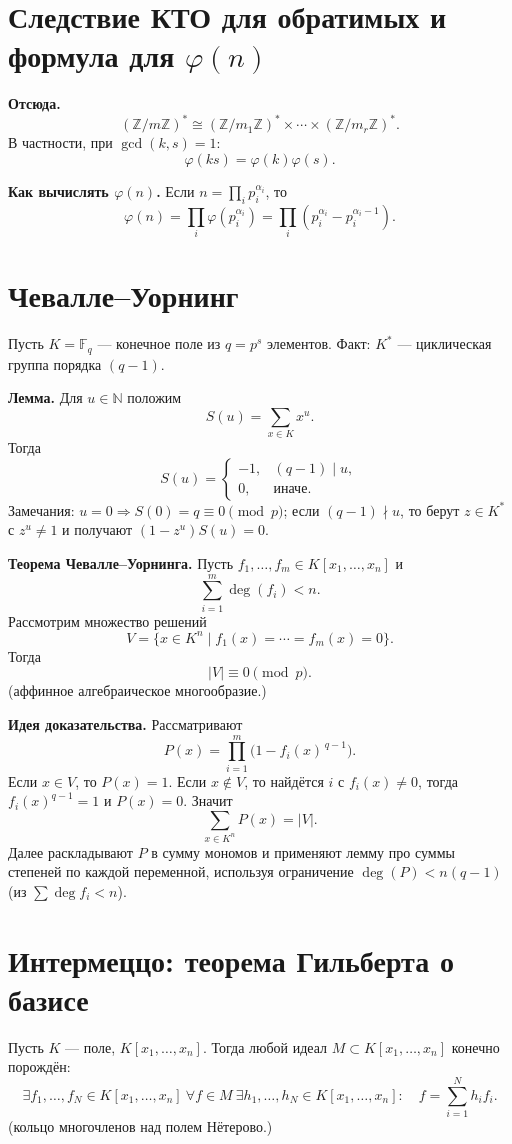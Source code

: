 \documentclass[12pt,a4paper]{article}
\newcommand{\Z}{\mathbb{Z}}
\DeclareMathOperator{\gcdop}{gcd}
\begin{document}
\section{Следствие КТО для обратимых и формула для $\varphi(n)$}

\textbf{Отсюда.}
\[
(\Z/m\Z)^{\ast}\cong (\Z/m_1\Z)^{\ast}\times\cdots\times(\Z/m_r\Z)^{\ast}.
\]
В частности, при $\gcdop(k,s)=1$:
\[
\varphi(ks)=\varphi(k)\varphi(s).
\]

\textbf{Как вычислять $\varphi(n)$.}
Если $n=\prod_{i} p_i^{\alpha_i}$, то
\[
\varphi(n)=\prod_i \varphi(p_i^{\alpha_i})
=\prod_i \left(p_i^{\alpha_i}-p_i^{\alpha_i-1}\right).
\]

\section{Чевалле--Уорнинг}

Пусть $K=\mathbb{F}_q$ — конечное поле из $q=p^s$ элементов.
Факт: $K^{\ast}$ — циклическая группа порядка $(q-1)$.

\textbf{Лемма.} Для $u\in \mathbb{N}$ положим
\[
S(u)=\sum_{x\in K} x^u.
\]
Тогда
\[
S(u)=
\begin{cases}
-1, & (q-1)\mid u,\\
0, & \text{иначе}.
\end{cases}
\]
Замечания: $u=0\Rightarrow S(0)=q\equiv 0\pmod p$; если $(q-1)\nmid u$, то
берут $z\in K^{\ast}$ с $z^u\neq 1$ и получают $(1-z^u)S(u)=0$.

\textbf{Теорема Чевалле--Уорнинга.} Пусть $f_1,\dots,f_m\in K[x_1,\dots,x_n]$ и
\[
\sum_{i=1}^m \deg(f_i) < n.
\]
Рассмотрим множество решений
\[
V=\{x\in K^n \mid f_1(x)=\cdots=f_m(x)=0\}.
\]
Тогда
\[
|V|\equiv 0\pmod p.
\]
(аффинное алгебраическое многообразие.)

\textbf{Идея доказательства.}
Рассматривают
\[
P(x)=\prod_{i=1}^m \bigl(1-f_i(x)^{\,q-1}\bigr).
\]
Если $x\in V$, то $P(x)=1$.
Если $x\notin V$, то найдётся $i$ с $f_i(x)\neq 0$, тогда $f_i(x)^{q-1}=1$ и $P(x)=0$.
Значит
\[
\sum_{x\in K^n} P(x)=|V|.
\]
Далее раскладывают $P$ в сумму мономов и применяют лемму про суммы степеней по каждой переменной,
используя ограничение $\deg(P)<n(q-1)$ (из $\sum \deg f_i < n$).

\section{Интермеццо: теорема Гильберта о базисе}

Пусть $K$ — поле, $K[x_1,\dots,x_n]$.
Тогда любой идеал $M\subset K[x_1,\dots,x_n]$ конечно порождён:
\[
\exists f_1,\dots,f_N\in K[x_1,\dots,x_n] \ \forall f\in M\ \exists h_1,\dots,h_N\in K[x_1,\dots,x_n]:
\quad
f=\sum_{i=1}^N h_i f_i.
\]
(кольцо многочленов над полем Нётерово.)
\end{document}
